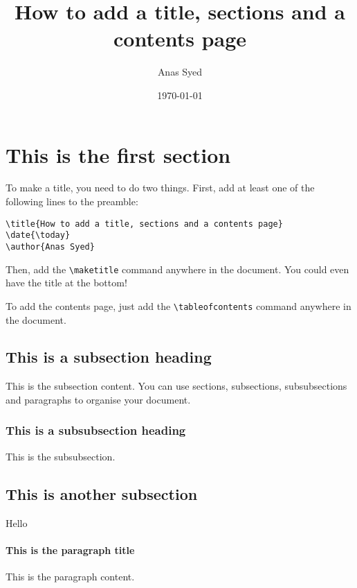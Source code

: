 \documentclass[a4paper,12pt]{article}
\title{How to add a title, sections and a contents page}
\date{\today}
\author{Anas Syed}
\begin{document}
\maketitle
\newpage %
\tableofcontents
\newpage %

\section{This is the first section}
To make a title, you need to do two things. First, add at least one of the following lines to the preamble:

\begin{verbatim}
\title{How to add a title, sections and a contents page}
\date{\today}
\author{Anas Syed}
\end{verbatim}

Then, add the \verb|\maketitle| command anywhere in the document. You could even have the title at the bottom!

To add the contents page, just add the \verb|\tableofcontents| command anywhere in the document.

\subsection{This is a subsection heading}
This is the subsection content. You can use sections, subsections, subsubsections and paragraphs to organise your document.

\subsubsection{This is a subsubsection heading}
This is the subsubsection.

\subsection{This is another subsection}
Hello

\paragraph{This is the paragraph title}
This is the paragraph content.
\end{document}
